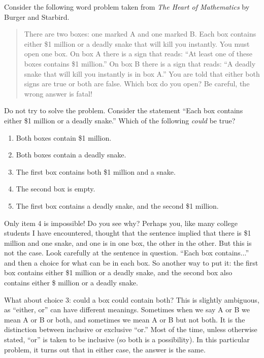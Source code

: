 \begin{example} Consider the following word problem taken from {\em The Heart of Mathematics} by Burger and Starbird.
\begin{quote}
There are two boxes: one marked A and one marked B. Each box contains either \$1 million or a deadly snake that will kill you instantly. You must open one box. On box A there is a sign that reads: “At least one of these boxes contains \$1 million.” On box B there is a sign that reads: “A deadly snake that will kill you instantly is in box A.” You are told that either both signs are true or both are false. Which box do you open? Be careful, the wrong answer is fatal!
\end{quote}
Do not try to solve the problem.  Consider the statement ``Each box contains either \$1 million or a deadly snake.''  Which of the following {\em could} be true?
\begin{enumerate}
 \item Both boxes contain \$1 million.
\item Both boxes contain a deadly snake.
\item The first box contains both \$1 million and a snake.
\item The second box is empty.
\item The first box contains a deadly snake, and the second \$1 million.
\end{enumerate}

\begin{solution}
 Only item 4 is impossible!  Do you see why?  Perhaps you, like many college students I have encountered, thought that the sentence implied that there is \$1 million and one snake, and one is in one box, the other in the other.  But this is not the case.  Look carefully at the sentence in question.  ``Each box contains...'' and then a choice for what can be in each box.  So another way to put it: the first box contains either \$1 million or a deadly snake, and the second box also contains either \$ million or a deadly snake.  

What about choice 3: could a box could contain both?  This is slightly ambiguous, as ``either, or'' can have different meanings.  Sometimes when we say A or B we mean A or B or both, and sometimes we mean A or B but not both.  It is the distinction between inclusive or exclusive ``or.''  Most of the time, unless otherwise stated, ``or'' is taken to be inclusive (so both is a possibility).  In this particular problem, it turns out that in either case, the answer is the same.  
\end{solution}
\end{example}

